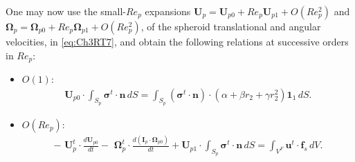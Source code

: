 \documentclass{jfm}
\begin{document}
 One may now use the small-$Re_p$ expansions $\bm{U}_p=\bm{U}_{p0}+Re_p \bm{U}_{p1}+O(Re_p^2)$ and $\bm{\Omega}_p=\bm{\Omega}_{p0}+Re_p \bm{\Omega}_{p1}+O(Re_p^2)$, of the spheroid translational and angular velocities, in \eqref{eq:Ch3RT7}, and obtain the following relations at successive orders in $Re_p$:
\begin{itemize} 
	\item $O(1)$:
\begin{align}
	\bm{U}_{p0}\cdot\int_{S_p} \bm{\sigma}^t\cdot \bm{n}\,dS=\int_{S_p} (\bm{\sigma}^t\cdot \bm{n})\cdot(\alpha+\beta r_2+\gamma r_2^2)\bm{1}_1\,dS.
	\label{eq:Ch3RT8}
\end{align}
	\item $O(Re_p)$:
\begin{align}
-\,\,\bm{U}_p^t\cdot \frac{d\bm{U}_{p0}}{dt}-\,\,\bm{\Omega}_p^t\cdot\frac{d(\bm{I}_p\cdot\bm{\Omega}_{p0})}{dt}+\bm{U}_{p1}\cdot\int_{S_p} \bm{\sigma}^t\cdot \bm{n}\,dS=\int_{V^F}\bm{u}^t\cdot\bm{f}_s\, dV .\label{eq:Ch3RT9}
\end{align}
\end{itemize}
\end{document}

